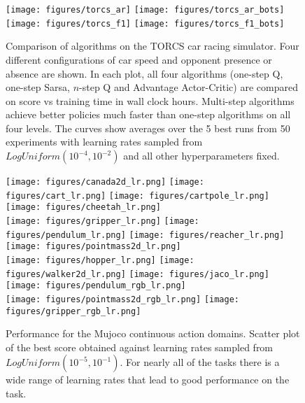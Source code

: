 \documentclass{article} \usepackage{times}
\begin{document}
\begin{figure}[h]
\begin{center}
\texttt{[image: figures/torcs\_ar]}
\texttt{[image: figures/torcs\_ar\_bots]} \\
\texttt{[image: figures/torcs\_f1]}
\texttt{[image: figures/torcs\_f1\_bots]}
\caption{\label{fig-torcs} Comparison of algorithms on the TORCS car racing simulator. Four different configurations of car speed and opponent presence or absence are shown. In each plot, all four algorithms (one-step Q, one-step Sarsa, $n$-step Q and Advantage Actor-Critic) are compared on score vs training time in wall clock hours. Multi-step algorithms achieve better policies much faster than one-step algorithms on all four levels. The curves show averages over the 5 best runs from 50 experiments with learning rates sampled from $LogUniform(10^{-4},10^{-2})$ and all other hyperparameters fixed.}
\vspace{-0.5cm}
\end{center}
\end{figure}

\begin{figure}[t]
    \texttt{[image: figures/canada2d\_lr.png]}
    \texttt{[image: figures/cart\_lr.png]}
    \texttt{[image: figures/cartpole\_lr.png]}
    \texttt{[image: figures/cheetah\_lr.png]}\\
    \texttt{[image: figures/gripper\_lr.png]}
    \texttt{[image: figures/pendulum\_lr.png]}
    \texttt{[image: figures/reacher\_lr.png]}
    \texttt{[image: figures/pointmass2d\_lr.png]}\\
    \texttt{[image: figures/hopper\_lr.png]}
    \texttt{[image: figures/walker2d\_lr.png]}
    \texttt{[image: figures/jaco\_lr.png]}
    \texttt{[image: figures/pendulum\_rgb\_lr.png]}\\
    \texttt{[image: figures/pointmass2d\_rgb\_lr.png]}
    \texttt{[image: figures/gripper\_rgb\_lr.png]}
    \caption{\label{fig-mujoco-lr} Performance for the Mujoco continuous action domains.
        Scatter plot of the best score obtained against learning rates
        sampled from $LogUniform(10^{-5},10^{-1})$.  For nearly all of the tasks
    there is a wide range of learning rates that lead to good performance on the task.}
\end{figure}
\end{document}
